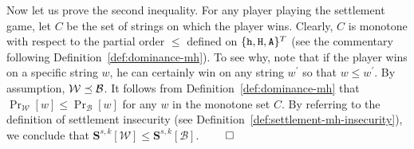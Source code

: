   Now let us prove the second inequality. 
  For any player playing the settlement game, 
  let $C$ be the set of strings on which the player wins. 
  Clearly, $C$ is monotone 
  with respect to the partial order $\leq$ 
  defined on $\{\mathtt{h}, \mathtt{H}, \mathtt{A}\}^T$ 
  (see the commentary following Definition~\ref{def:dominance-mh}).  
  To see why, note that if the player wins 
  on a specific string $w$, 
  he can certainly win on any string $w^\prime$ so that $w \leq w^\prime$. 
  By assumption, 
  $\mathcal{W} \preceq \mathcal{B}$. 
  It follows from Definition~\ref{def:dominance-mh} that 
  $\Pr_{\mathcal{W}}[w] \leq \Pr_{\mathcal{B}}[w]$ 
  for any $w$ in the monotone set $C$. 
  By referring to the definition of settlement insecurity 
  (see Definition~\ref{def:settlement-mh-insecurity}), 
  we conclude that 
  $
    \mathbf{S}^{s,k}[\mathcal{W}] \leq \mathbf{S}^{s,k}[\mathcal{B}]
  $.
  \hfill $\qed$  







